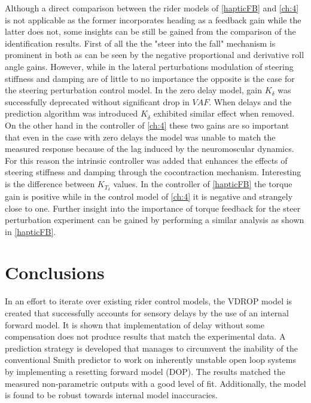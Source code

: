 Although a direct comparison between the rider models of \cref{hapticFB} and \cref{ch:4} is not applicable as the former incorporates heading as a feedback gain while the latter does not, some insights can be still be gained from the comparison of the identification results. First of all the the "steer into the fall" mechanism is prominent in both as can be seen by the negative proportional and derivative roll angle gains. However, while in the lateral perturbations modulation of steering stiffness and damping are of little to no importance the opposite is the case for the steering perturbation control model. In the zero delay model, gain \ensuremath{K_\delta} was successfully deprecated without  significant drop in \ensuremath{\mathit{VAF}}. When delays and the prediction algorithm was introduced \ensuremath{K_{\dot{\delta}}} exhibited similar effect when removed. On the other hand in the controller of \cref{ch:4} these two gains are so important that even in the case with zero delays the model was unable to match the measured response because of the lag induced by the neuromoscular dynamics. For this reason the intrinsic controller was added that enhances the effects of steering stiffness and damping through the cocontraction mechanism. Interesting is the difference between \ensuremath{K_{T_\delta}} values. In the controller of \cref{hapticFB} the torque gain is positive while in the control model of \cref{ch:4} it is negative and strangely close to one. Further insight into the importance of torque feedback for the steer perturbation experiment can be gained by performing a similar analysis as shown in \cref{hapticFB}. 
\chapter{Conclusions}
 
In an effort to iterate over existing rider control models, the VDROP model is created that successfully accounts for sensory delays by the use of an internal forward model. It is shown that implementation of delay without some compensation does not produce results that match the experimental data.  A prediction strategy is developed that manages to  circumvent the inability of the conventional Smith predictor to work on inherently unstable open loop systems by implementing a resetting forward model (DOP). The results matched the  measured non-parametric outputs with a good level of fit. Additionally, the model is found to be robust towards internal model inaccuracies. 
 
